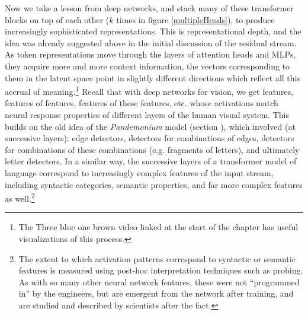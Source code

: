 Now we take a lesson from deep networks, and stack many of these transformer
blocks on top of each other ($k$ times in figure \ref{multipleHeads}), to
produce increasingly sophisticated representations. This is representational
depth, and the idea was already suggested above in the initial discussion of
the residual stream.  As token representations move through the layers of
attention heads and MLPs, they acquire more and more context information, the
vectors corresponding to them in the latent space point in slightly different
directions which reflect all this accrual of meaning.\footnote{The Three blue
one brown video linked at the start of the chapter has useful visualizations of
this process.}  Recall that with deep networks for vision, we get features,
features of features, features of these features, etc. whose activations match
neural response properties of different layers of the human visual system. This
builds on the old idea of the \emph{Pandemonium} model (section
), which involved (at successive layers): edge detectors,
detectors for combinations of edges, detectors for combinations of these
combinations (e.g. fragments of letters), and ultimately letter detectors. In a
similar way, the successive layers of a transformer model of language
correspond to increasingly complex features of the input stream, including
syntactic categories, semantic properties, and far more complex features as
well.\footnote{The extent to which activation patterns correspond to syntactic
or semantic features is measured using post-hoc interpretation techniques such
as probing. As with so many other neural network features, these were not
``programmed in'' by the engineers, but are emergent from the network after
training, and are studied and described by scientists after the fact.}


